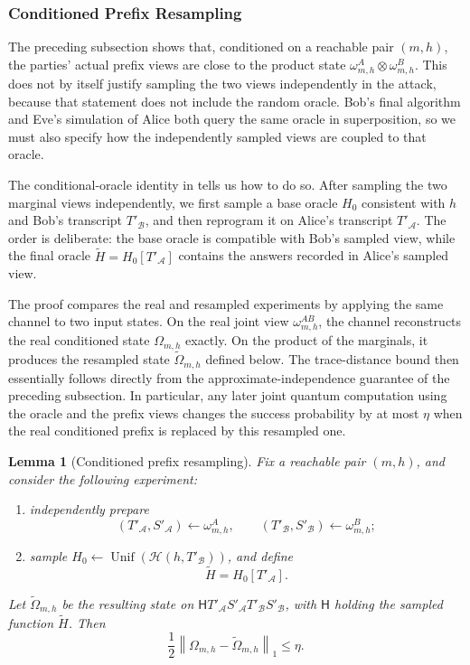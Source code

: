 \documentclass[11pt]{article}
\newcounter{algorithm}
\newtheorem{lemma}[lemma]{Lemma}
\newcommand{\cA}{\mathcal{A}}
\newcommand{\cB}{\mathcal{B}}
\newcommand{\cH}{\mathcal{H}}
\newcommand{\Unif}{\operatorname{Unif}}
\begin{document}
\subsubsection{Conditioned Prefix Resampling}
\label{sec:conditioned-prefix-resampling}

The preceding subsection shows that, conditioned on a reachable pair
\((m,h)\), the parties' actual prefix views are close to the product state
\(\omega^A_{m,h}\otimes\omega^B_{m,h}\).  This does not by itself justify
sampling the two views independently in the attack, because that statement
does not include the random oracle.  Bob's final algorithm and Eve's
simulation of Alice both query the same oracle in superposition, so we must
also specify how the independently sampled views are coupled to that oracle.

The conditional-oracle identity in
 tells us how to do so.  After
sampling the two marginal views independently, we first sample a base oracle
\(H_0\) consistent with \(h\) and Bob's transcript \(T'_{\cB}\), and then
reprogram it on Alice's transcript \(T'_{\cA}\).  The order is deliberate:
the base oracle is compatible with Bob's sampled view, while the final
oracle \(\widetilde H=H_0[T'_{\cA}]\) contains the answers recorded in
Alice's sampled view. 

The proof compares the real and resampled experiments by applying the same
channel to two input states.  On the real joint view
\(\omega^{AB}_{m,h}\), the channel reconstructs the real conditioned state
\(\Omega_{m,h}\) exactly.  On the product of the marginals, it produces the
resampled state \(\widetilde\Omega_{m,h}\) defined below.  The trace-distance
bound then essentially follows directly from the
approximate-independence guarantee of the preceding subsection.  In
particular, any later joint quantum computation using the oracle and the
prefix views changes the success probability by at most \(\eta\) when the
real conditioned prefix is replaced by this resampled one.

\begin{lemma}[Conditioned prefix resampling]
\label{lem:prefix-resampling}
Fix a reachable pair $(m,h)$, and consider the following experiment:
\begin{enumerate}[leftmargin=2em]
  \item independently prepare
  \[
    (T'_{\cA},S'_{\cA})\leftarrow\omega^A_{m,h},
    \qquad
    (T'_{\cB},S'_{\cB})\leftarrow\omega^B_{m,h};
  \]
  \item sample $H_0\leftarrow\Unif(\cH(h,T'_{\cB}))$, and define
  \[
    \widetilde H=H_0[T'_{\cA}].
  \]
\end{enumerate}
Let $\widetilde\Omega_{m,h}$ be the resulting state on
$\mathsf H T'_{\cA}S'_{\cA}T'_{\cB}S'_{\cB}$, with $\mathsf H$ holding the
sampled function $\widetilde H$.  Then
\[
  \frac12
  \left\|
    \Omega_{m,h}
    -
    \widetilde\Omega_{m,h}
  \right\|_1
  \le \eta.
\]
\end{lemma}
\end{document}
